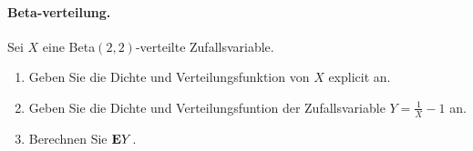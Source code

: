 \paragraph{Beta-verteilung.} Sei $X$ eine Beta$(2,2)$-verteilte Zufallsvariable.
\begin{enumerate}
    \item Geben Sie die Dichte und Verteilungsfunktion von $X$ explicit an. 
    \item Geben Sie die Dichte und Verteilungsfuntion der Zufallsvariable
        $Y = \frac{1}{X} - 1$ an. 
    \item Berechnen Sie $\mathbf{E} Y$.  
\end{enumerate}






